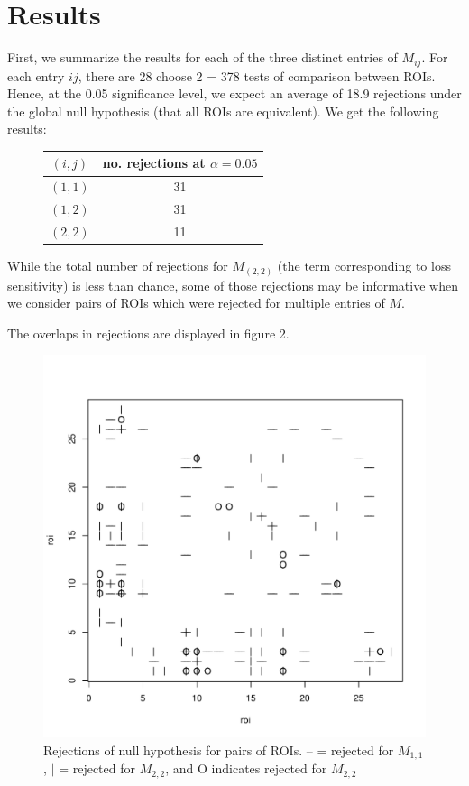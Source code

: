 \documentclass[12pt]{article}
\begin{document}
\section{Results}

First, we summarize the results for each of the three distinct entries of $M_{ij}$.
For each entry $ij$, there are 28 choose 2 = 378 tests of comparison between ROIs.
Hence, at the 0.05 significance level, we expect an average of 18.9 rejections under the global null hypothesis (that all ROIs are equivalent).
We get the following results:

\begin{figure}[h]
\begin{tabular}{c|c}
$(i, j)$ & no. rejections at $\alpha = 0.05$\\\hline
$(1, 1)$ & 31\\
$(1,2)$ & 31\\
$(2,2)$ & 11\\
\end{tabular}
\end{figure}

While the total number of rejections for $M_{(2,2)}$ (the term corresponding to loss sensitivity)
is less than chance, some of those rejections may be informative when we consider
pairs of ROIs which were rejected for multiple entries of $M$. 

The overlaps in rejections are displayed in figure 2.
\begin{figure}[h]
\centering
\includegraphics[scale = 0.5]{../a7plots/rejs.pdf}
\caption{Rejections of null hypothesis for pairs of ROIs. -- = rejected for $M_{1,1}$, $|$ = rejected for $M_{2,2}$, and O indicates rejected for $M_{2,2}$}
\end{figure}
\end{document}
